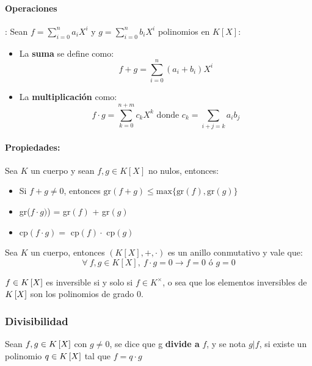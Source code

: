 \paragraph{Operaciones}: Sean $f=\sum_{i=0}^{n}a_iX^i$ y $g=\sum_{i=0}^{n}b_iX^i$ polinomios en $K\left[ X \right]$: 
\begin{itemize}
    \item La \textbf{suma} se define como:
    \begin{equation*}
        f + g = \sum_{i=0}^{n}(a_i + b_i)X^i
    \end{equation*}
    \item La \textbf{multiplicación} como:
    \begin{equation*}
        f\cdot g = \sum_{k=0}^{n+m}c_kX^k \text{ donde } c_k = \sum_{i+j = k} a_ib_j
    \end{equation*}
\end{itemize}

\paragraph{Propiedades:} Sea $K$ un cuerpo y sean $f,g\in K\left[ X \right]$ no nulos, entonces:\
\begin{itemize}
    \item Si $f+g\neq 0$, entonces $\text{gr}(f+g)\leq \text{max}\{\text{gr}(f),\text{gr}(g)\}$
    \item gr($f\cdot g)$) = gr$(f)$ + gr$(g)$
    \item cp$(f\cdot g) =$ cp$(f)\cdot$ cp$(g)$
\end{itemize}

Sea $K$ un cuerpo, entonces $(K\left[X\right],+,\cdot)$ es un anillo conmutativo y vale que:
\begin{equation*}
    \forall~f,g\in K\left[X\right],~f\cdot g = 0\to f=0 \text{ ó } g=0
\end{equation*}


$f\in K\left[X\right]$ es inversible si y solo si $f\in K^\times$, o sea que los elementos inversibles de $K\left[X\right]$ son los polinomios de grado 0.

\subsubsection{Divisibilidad}
Sean $f,g\in K\left[X\right]$ con $g\neq0$, se dice que g \textbf{divide a} $f$, y se nota $g|f$, si existe un polinomio $q\in K\left[X\right]$ tal que $f = q\cdot g$

